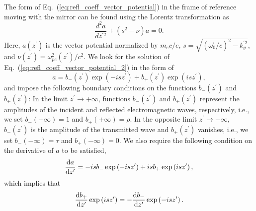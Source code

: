 \documentclass[10pt, a4paper, twoside, openright]{report}
\begin{document}
The form of Eq.~(\ref{eq:refl_coeff_vector_potential}) in the frame of reference moving with the mirror can be found using the Lorentz transformation as \cite{Panchenko2008, Bulanov2013}
\begin{equation}\label{eq:refl_coeff_vector_potential_2}
\frac{d^2 a}{d z^{\prime 2}}+ \left( s^2 - \nu \right) a = 0.
\end{equation}
Here, $ a \left( z^{\prime} \right) $ is the vector potential normalized by $ m_e c / e $, $ s = \sqrt{ \left( \omega_0^{\prime} / c \right)^2 - k_y^{\prime 2}} $, and $ \nu \left( z^{\prime} \right) = \omega_{pe}^2\left( z^{\prime} \right) / c^2 $. We look for the solution of Eq.~(\ref{eq:refl_coeff_vector_potential_2}) in the form of
\begin{equation}\label{eq:vector_potential_form}
a = b_{-} \left( z^{\prime} \right) \exp \left( -i s z^{\prime} \right) + b_{+} \left( z^{\prime} \right) \exp \left( i s z^{\prime} \right),
\end{equation}
and impose the following boundary conditions on the functions $ b_{-} \left( z^{\prime} \right) $ and $ b_{+} \left( z^{\prime} \right) $: In the limit $ z^{\prime} \rightarrow +\infty $, functions $ b_{-} \left( z^{\prime} \right) $ and $ b_{+} \left( z^{\prime} \right) $ represent the amplitudes of the incident and reflected electromagnetic waves, respectively, i.e., we set $ b_{-} \left( +\infty \right) = 1 $ and $ b_{+} \left( +\infty \right) = \rho $. In the opposite limit $ z^{\prime} \rightarrow -\infty $, $ b_{-} \left( z^{\prime} \right) $ is the amplitude of the transmitted wave and $ b_{+} \left( z^{\prime} \right) $ vanishes, i.e., we set $ b_{-} \left( -\infty \right) = \tau $ and $ b_{+} \left( -\infty \right) = 0 $. We also require the following condition on the derivative of $ a $ to be satisfied,
\begin{equation}\label{eq:boundary_condition_1}
\diff{a}{z^{\prime}} = -i s b_{-} \exp \left( -i s z^{\prime} \right) + i s b_{+} \exp \left( i s z^{\prime} \right),
\end{equation}
which implies that
\begin{equation}\label{eq:boundary_condition_2}
\diff{b_{+}}{z^{\prime}} \exp \left( i s z^{\prime} \right) = -\diff{b_{-}}{z^{\prime}} \exp \left( -i s z^{\prime} \right).
\end{equation}
\end{document}
